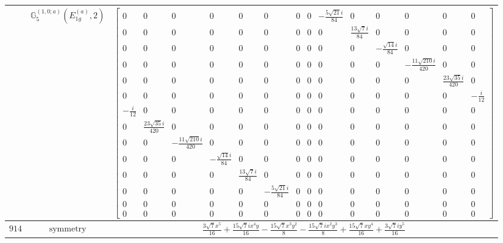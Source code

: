 \documentclass[fleqn,8pt,landscape]{jsarticle}
\begin{document}
\begin{longtable}{ccc}
$  $ & $ \mathbb{G}_{5}^{(1,0;a)}(E_{1g}^{(a)},2) $ & $ \begin{bmatrix} 0 & 0 & 0 & 0 & 0 & 0 & 0 & 0 & - \frac{5 \sqrt{21} i}{84} & 0 & 0 & 0 & 0 & 0 \\ 0 & 0 & 0 & 0 & 0 & 0 & 0 & 0 & 0 & \frac{13 \sqrt{7} i}{84} & 0 & 0 & 0 & 0 \\ 0 & 0 & 0 & 0 & 0 & 0 & 0 & 0 & 0 & 0 & - \frac{\sqrt{14} i}{84} & 0 & 0 & 0 \\ 0 & 0 & 0 & 0 & 0 & 0 & 0 & 0 & 0 & 0 & 0 & - \frac{11 \sqrt{210} i}{420} & 0 & 0 \\ 0 & 0 & 0 & 0 & 0 & 0 & 0 & 0 & 0 & 0 & 0 & 0 & \frac{23 \sqrt{35} i}{420} & 0 \\ 0 & 0 & 0 & 0 & 0 & 0 & 0 & 0 & 0 & 0 & 0 & 0 & 0 & - \frac{i}{12} \\ - \frac{i}{12} & 0 & 0 & 0 & 0 & 0 & 0 & 0 & 0 & 0 & 0 & 0 & 0 & 0 \\ 0 & \frac{23 \sqrt{35} i}{420} & 0 & 0 & 0 & 0 & 0 & 0 & 0 & 0 & 0 & 0 & 0 & 0 \\ 0 & 0 & - \frac{11 \sqrt{210} i}{420} & 0 & 0 & 0 & 0 & 0 & 0 & 0 & 0 & 0 & 0 & 0 \\ 0 & 0 & 0 & - \frac{\sqrt{14} i}{84} & 0 & 0 & 0 & 0 & 0 & 0 & 0 & 0 & 0 & 0 \\ 0 & 0 & 0 & 0 & \frac{13 \sqrt{7} i}{84} & 0 & 0 & 0 & 0 & 0 & 0 & 0 & 0 & 0 \\ 0 & 0 & 0 & 0 & 0 & - \frac{5 \sqrt{21} i}{84} & 0 & 0 & 0 & 0 & 0 & 0 & 0 & 0 \\ 0 & 0 & 0 & 0 & 0 & 0 & 0 & 0 & 0 & 0 & 0 & 0 & 0 & 0 \\ 0 & 0 & 0 & 0 & 0 & 0 & 0 & 0 & 0 & 0 & 0 & 0 & 0 & 0 \end{bmatrix} $ \\ \hline
$ 914 $ & $ \text{symmetry} $ & $ \frac{3 \sqrt{7} x^{5}}{16} + \frac{15 \sqrt{7} i x^{4} y}{16} - \frac{15 \sqrt{7} x^{3} y^{2}}{8} - \frac{15 \sqrt{7} i x^{2} y^{3}}{8} + \frac{15 \sqrt{7} x y^{4}}{16} + \frac{3 \sqrt{7} i y^{5}}{16} $ \\

\end{longtable}
\end{document}
